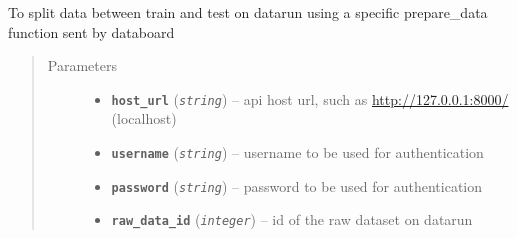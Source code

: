 \documentclass[letterpaper,10pt,english]{sphinxmanual}
\begin{document}
\begin{fulllineitems}
\label{modules/views:test_files.post_api.custom_post_split}
To split data between train and test on datarun using a specific
prepare\_data function sent by databoard
\begin{quote}\begin{description}
\item[{Parameters}] \leavevmode\begin{itemize}
\item {} 
\textbf{\texttt{host\_url}} (\emph{\texttt{string}}) -- api host url, such as \url{http://127.0.0.1:8000/} (localhost)

\item {} 
\textbf{\texttt{username}} (\emph{\texttt{string}}) -- username to be used for authentication

\item {} 
\textbf{\texttt{password}} (\emph{\texttt{string}}) -- password to be used for authentication

\item {} 
\textbf{\texttt{raw\_data\_id}} (\emph{\texttt{integer}}) -- id of the raw dataset on datarun

\end{itemize}

\end{description}\end{quote}

\end{fulllineitems}

\end{document}
